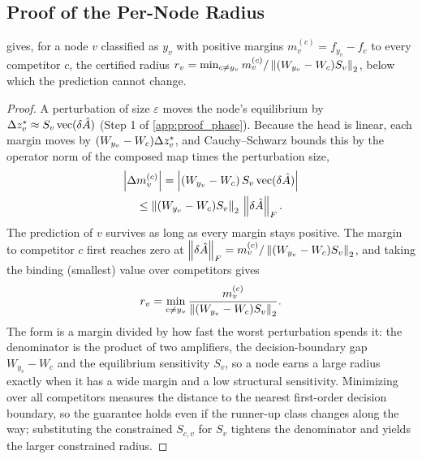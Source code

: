 \subsection{Proof of the Per-Node Radius}
\label{app:proof_radius}

 gives, for a node $v$ classified as $y_v$ with positive margins
$m_v^{(c)}=f_{y_v}-f_c$ to every competitor $c$, the certified radius
$r_v=\min_{c\ne y_v}m_v^{(c)}/\left\|(W_{y_v}-W_c)S_v\right\|_2$, below which the prediction cannot change.

\begin{proof}
A perturbation of size $\varepsilon$ moves the node's equilibrium by
$\Delta z^{*}_v\approx S_v\,\mathrm{vec}(\delta\hat{A})$ (Step 1 of \cref{app:proof_phase}). Because the
head is linear, each margin moves by $(W_{y_v}-W_c)\Delta z^{*}_v$, and Cauchy--Schwarz bounds this by
the operator norm of the composed map times the perturbation size,
\begin{multline}
\left|\Delta m_v^{(c)}\right|=\left|(W_{y_v}-W_c)\,S_v\,\mathrm{vec}(\delta\hat{A})\right|\\
\le\left\|(W_{y_v}-W_c)S_v\right\|_2\,\left\|\delta\hat{A}\right\|_F.
\label{eq:margin-move}
\end{multline}
The prediction of $v$ survives as long as every margin stays positive. The margin to competitor $c$
first reaches zero at $\left\|\delta\hat{A}\right\|_F=m_v^{(c)}/\left\|(W_{y_v}-W_c)S_v\right\|_2$, and taking the binding
(smallest) value over competitors gives
\begin{equation}
r_v=\min_{c\ne y_v}\frac{m_v^{(c)}}{\left\|(W_{y_v}-W_c)S_v\right\|_2}.
\label{eq:radius-restate}
\end{equation}
The form is a margin divided by how fast the worst perturbation spends it: the denominator is the
product of two amplifiers, the decision-boundary gap $W_{y_v}-W_c$ and the equilibrium sensitivity
$S_v$, so a node earns a large radius exactly when it has a wide margin and a low structural
sensitivity. Minimizing over all competitors measures the distance to the nearest first-order decision
boundary, so the guarantee holds even if the runner-up class changes along the way; substituting the
constrained $S_{c,v}$ for $S_v$ tightens the denominator and yields the larger constrained radius.
\end{proof}
